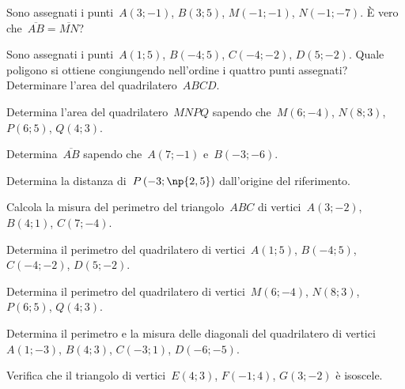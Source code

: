 \begin{esercizio}
\label{ese:\thechapter.21}
Sono assegnati i punti~$A(3;-1)$, $B(3;5)$, $M(-1;-1)$, $N(-1;-7)$. È vero che~$\overline{AB}=\overline{MN}$?
\end{esercizio}

\begin{esercizio}
\label{ese:\thechapter.22}
Sono assegnati i punti~$A(1;5)$, $B(-4;5)$, $C(-4;-2)$, $D(5;-2)$. Quale poligono si ottiene congiungendo nell'ordine i quattro
punti assegnati? Determinare l'area del quadrilatero~$ABCD$.
\end{esercizio}

\begin{esercizio}
\label{ese:\thechapter.23}
Determina l'area del quadrilatero~$MNPQ$ sapendo che~$M(6;-4)$, $N(8;3)$, $P(6;5)$, $Q(4;3)$.
\end{esercizio}

\begin{esercizio}
\label{ese:\thechapter.24}
Determina~$\overline{AB}$ sapendo che~$A(7;-1)$ e~$B(-3;-6)$.
\end{esercizio}

\begin{esercizio}
\label{ese:\thechapter.25}
Determina la distanza di~$P\left(-3;\np{2,5}\right)$ dall'origine del riferimento.
\end{esercizio}

\begin{esercizio}
\label{ese:\thechapter.26}
Calcola la misura del perimetro del triangolo~$ABC$ di vertici~$A(3;-2)$, $B(4;1)$, $C(7;-4)$.
\end{esercizio}

\begin{esercizio}
\label{ese:\thechapter.27}
Determina il perimetro del quadrilatero di vertici~$A(1;5)$, $B(-4;5)$, $C(-4;-2)$, $D(5;-2)$.
\end{esercizio}

\begin{esercizio}
\label{ese:\thechapter.28}
Determina il perimetro del quadrilatero di vertici~$M(6;-4)$, $N(8;3)$, $P(6;5)$, $Q(4;3)$.
\end{esercizio}

\begin{esercizio}
\label{ese:\thechapter.29}
Determina il perimetro e la misura delle diagonali del quadrilatero di vertici~$A(1;-3)$, $B(4;3)$, $C(-3;1)$, $D(-6;-5)$.
\end{esercizio}

\begin{esercizio}
\label{ese:\thechapter.30}
Verifica che il triangolo di vertici~$E(4;3)$, $F(-1;4)$, $G(3;-2)$ è isoscele.
\end{esercizio}

